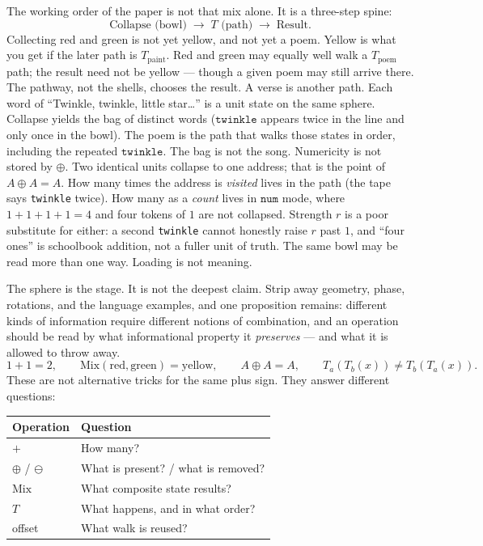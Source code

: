 \documentclass[12pt, a4paper]{article}
\begin{document}
The working order of the paper is not that mix alone. It is a three-step spine:
\[
\text{Collapse (bowl)} \;\longrightarrow\; T\text{ (path)} \;\longrightarrow\; \text{Result}.
\]
Collecting red and green is not yet yellow, and not yet a poem.
Yellow is what you get if the later path is $T_{\mathrm{paint}}$.
Red and green may equally well walk a $T_{\mathrm{poem}}$ path; the
result need not be yellow --- though a given poem may still arrive
there. The pathway, not the shells, chooses the result. A verse is
another path.
Each word of ``Twinkle, twinkle, little star\ldots'' is a unit state
on the same sphere. Collapse yields the bag of distinct words
($\texttt{twinkle}$ appears twice in the line and only once in the
bowl). The poem is the path that walks those states in order,
including the repeated $\texttt{twinkle}$. The bag is not the song.
Numericity is not stored by $\oplus$. Two identical units collapse
to one address; that is the point of $A\oplus A=A$. How many times
the address is \emph{visited} lives in the path (the tape says
\texttt{twinkle} twice). How many as a \emph{count} lives in
$\mathtt{num}$ mode, where $1+1+1+1=4$ and four tokens of $1$ are
not collapsed. Strength $r$ is a poor substitute for either: a
second \texttt{twinkle} cannot honestly raise $r$ past $1$, and
``four ones'' is schoolbook addition, not a fuller unit of truth.
The same bowl may be read more than one way. Loading is not meaning.

The sphere is the stage. It is not the deepest claim. Strip away
geometry, phase, rotations, and the language examples, and one
proposition remains: different kinds of information require different
notions of combination, and an operation should be read by what
informational property it \emph{preserves} --- and what it is allowed
to throw away.
\[
1+1=2,
\qquad
\mathrm{Mix}(\mathrm{red},\mathrm{green})=\mathrm{yellow},
\qquad
A\oplus A=A,
\qquad
T_a(T_b(x))\neq T_b(T_a(x)).
\]
These are not alternative tricks for the same plus sign. They answer
different questions:

\begin{center}
\begin{tabular}{ll}
Operation & Question \\
\hline
$+$ & How many? \\
$\oplus$ / $\ominus$ & What is present? / what is removed? \\
$\mathrm{Mix}$ & What composite state results? \\
$T$ & What happens, and in what order? \\
offset & What walk is reused? \\
\end{tabular}
\end{center}
\end{document}
